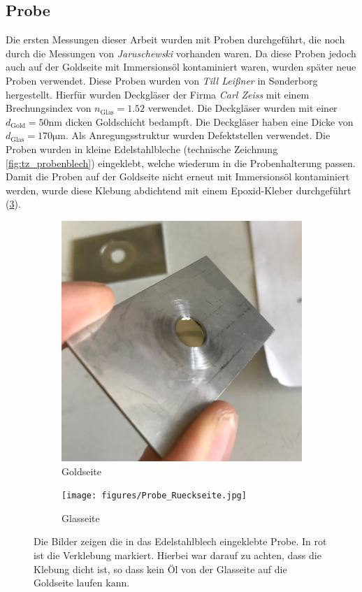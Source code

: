\documentclass[titlepage,  ngerman]{article}
\begin{document}
	\subsection{Probe}
	Die ersten Messungen dieser Arbeit wurden mit Proben durchgeführt, die noch durch die Messungen von \textit{Jaruschewski} \cite{Jaruschewski.2020} vorhanden waren. Da diese Proben jedoch auch auf der Goldseite mit Immersionsöl kontaminiert waren, wurden später neue Proben verwendet. Diese Proben wurden von \textit{Till Leißner} in S\o nderborg hergestellt. Hierfür wurden Deckgläser der Firma \textit{Carl Zeiss} mit einem Brechungsindex von $n_{\mathrm{Glas}}= 1.52$ verwendet. Die Deckgläser wurden mit einer $d_{\mathrm{Gold}} = 50\mathrm{nm}$ dicken Goldschicht bedampft. Die Deckgläser haben eine Dicke von $d_{\mathrm{Glas}} = 170 \mathrm{\mu m}$. Als Anregungsstruktur wurden Defektstellen verwendet. Die Proben wurden in kleine Edelstahlbleche (technische Zeichnung \ref{fig:tz_probenblech}) eingeklebt, welche wiederum in die Probenhalterung passen. Damit die Proben auf der Goldseite nicht erneut mit Immersionsöl kontaminiert werden, wurde diese Klebung abdichtend mit einem Epoxid-Kleber durchgeführt (\ref{fig:probe}).
	\begin{figure}[h]
		\centering
		\begin{subfigure}{0.4\textwidth}
			\centering
			\includegraphics[width=\textwidth]{figures/Probe_Vorderseite.jpg}
			\caption{Goldseite}
			\label{fig:probe_vorderseite}
		\end{subfigure}
		\hfill
		\begin{subfigure}{0.4\textwidth}
			\centering
			\texttt{[image: figures/Probe\_Rueckseite.jpg]}
			\caption{Glasseite}
			\label{fig:probe_rueckseite}
		\end{subfigure}
		\caption[Eingeklebte Probe]{Die Bilder zeigen die in das Edelstahlblech eingeklebte Probe. In rot ist die Verklebung markiert. Hierbei war darauf zu achten, dass die Klebung dicht ist, so dass kein Öl von der Glasseite auf die Goldseite laufen kann.}
		\label{fig:probe}
	\end{figure}
\end{document}
